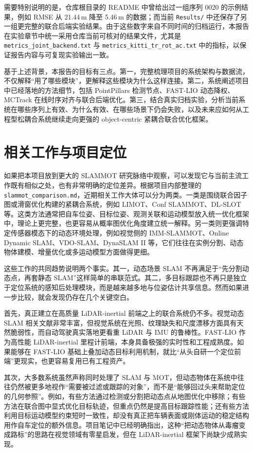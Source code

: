 \documentclass[UTF8,a4paper,12pt]{ctexart}
\begin{document}
需要特别说明的是，仓库根目录的 README 中曾给出过一组序列 0020 的示例结果，例如 RMSE 从 21.44\,m 降至 5.46\,m 的数据；而当前 \texttt{Results/} 中还保存了另一组更完整的联合后端实验结果。由于这些数字来自不同时间的归档运行，本报告在实验章节中统一采用仓库当前可核对的结果文件，尤其是 \texttt{metrics\_joint\_backend.txt} 与 \texttt{metrics\_kitti\_tr\_rot\_ac.txt} 中的指标，以保证报告内容与可复现实验输出一致。

基于上述背景，本报告的目标有三点。第一，完整梳理项目的系统架构与数据流，不仅解释“用了哪些模块”，更解释这些模块为什么这样连接。第二，系统阐述项目中已经落地的方法细节，包括 PointPillars 检测节点、FAST-LIO 动态降权、MCTrack 在线时序对齐与联合后端优化。第三，结合真实归档实验，分析当前系统在哪些序列上有效、为什么有效、在哪些场景下仍会失败，以及未来应如何从工程型松耦合系统继续走向更强的 object-centric 紧耦合联合优化框架。

\section{相关工作与项目定位}
如果把本项目放到更大的 SLAMMOT 研究脉络中观察，可以发现它与当前主流工作既有相似之处，也有非常明确的定位差异。根据项目内部整理的 \texttt{slammot\_comparison.md}，近期相关工作大体可以分为两类。一类是围绕联合因子图或滑窗优化构建的紧耦合系统，例如 LIMOT、Conf SLAMMOT、DL-SLOT 等。这类方法通常把自车位姿、目标位姿、观测关联和运动模型放入统一优化框架中，理论上更完整，也更容易从概率图优化角度建立统一解释。另一类则更强调特定传感器模态下的动态环境处理，例如视觉侧的 IMM-SLAMMOT、Online Dynamic SLAM、VDO-SLAM、DynaSLAM II 等，它们往往在实例分割、动态物体建模、增量优化或多运动模型方面做得更细。

这些工作的共同趋势说明两个事实。其一，动态场景 SLAM 不再满足于“先分割动态点，再套静态 SLAM”这样简单的串联范式。其二，多目标跟踪也不再只是独立于定位系统的感知后处理模块，而是越来越多地与位姿估计共享信息。然而如果进一步比较，就会发现仍存在几个关键空白。

首先，真正建立在高质量 LiDAR-inertial 前端之上的联合系统仍不多。视觉动态 SLAM 相关文献非常丰富，但视觉系统在光照、纹理缺失和尺度漂移方面具有天然脆弱性，而自动驾驶真实落地更看重 LiDAR 与 IMU 的鲁棒性。FAST-LIO 作为高性能 LiDAR-inertial 里程计前端，本身具备极强的实时性和工程成熟度。如果能够在 FAST-LIO 基础上叠加动态目标利用机制，就比“从头自研一个定位前端”更现实，也更容易复用已有工程资产。

其次，大多数系统虽然声称同时处理了 SLAM 与 MOT，但动态物体在系统中往往仍然被更多地视作“需要被过滤或跟踪的对象”，而不是“能够回过头来帮助定位的几何参照”。例如，有些方法通过检测或分割把动态点从地图优化中移除；有些方法在联合图中显式优化目标轨迹，但重点仍然是提高目标跟踪性能；还有些方法利用目标运动模型约束短时一致性，却没有真正把车辆表面或刚体运动的稳定结构用作自车定位的额外信息。项目笔记中已经明确指出，这种“把动态物体从毒瘤变成路标”的思路在视觉领域有零星启发，但在 LiDAR-inertial 框架下尚缺少成熟实现。
\end{document}
